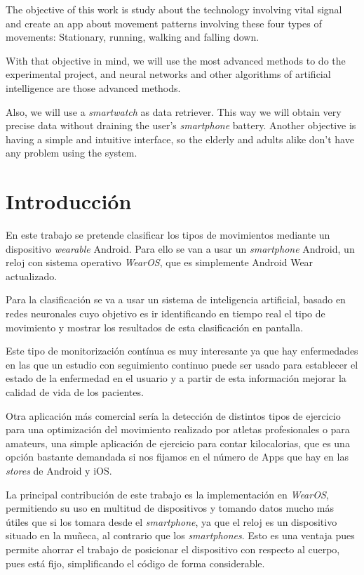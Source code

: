 \documentclass[12pt]{book}
\numberwithin{equation}{section}
\begin{document}
The objective of this work is study about the technology involving vital signal and create an app about movement patterns involving these four types of movements: Stationary, running, walking and falling down.

With that objective in mind, we will use the most advanced methods to do the experimental project, and neural networks and other algorithms of artificial intelligence are those advanced methods.

Also, we will use a \textit{smartwatch} as data retriever. This way we will obtain very precise data without draining the user's \textit{smartphone} battery. Another objective is having a simple and intuitive interface, so the elderly and adults alike don't have any problem using the system.

\newpage
\chapter{Introducción}

En este trabajo se pretende clasificar los tipos de movimientos mediante un dispositivo \textit{wearable} Android. Para ello se van a usar un \textit{smartphone} Android, un reloj con sistema operativo \textit{WearOS}, que es simplemente Android Wear actualizado.

Para la clasificación se va a usar un sistema de inteligencia artificial, basado en redes neuronales cuyo objetivo es ir identificando en tiempo real el tipo de movimiento y mostrar los resultados de esta clasificación en pantalla.

Este tipo de monitorización contínua es muy interesante ya que hay enfermedades en las que un estudio con seguimiento continuo puede ser usado para establecer el estado de la enfermedad en el usuario y a partir de esta información mejorar la calidad de vida de los pacientes.

Otra aplicación más comercial sería la detección de distintos tipos de ejercicio para una optimización del movimiento realizado por atletas profesionales o para amateurs, una simple aplicación de ejercicio para contar kilocalorias, que es una opción bastante demandada si nos fijamos en el número de Apps que hay en las \textit{stores} de Android y iOS.

La principal contribución de este trabajo es la implementación en \textit{WearOS}, permitiendo su uso en multitud de dispositivos y tomando datos mucho más útiles que si los tomara desde el \textit{smartphone}, ya que el reloj es un dispositivo situado en la muñeca, al contrario que los \textit{smartphones}. Esto es una ventaja pues permite ahorrar el trabajo de posicionar el dispositivo con respecto al cuerpo, pues está fijo, simplificando el código de forma considerable.
\end{document}

